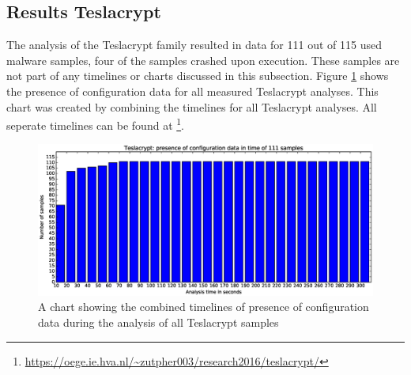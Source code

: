\documentclass[conference]{IEEEtran}
\begin{document}
\newpage
\subsection{Results Teslacrypt}
The analysis of the Teslacrypt family resulted in data for 111 out of 115 used malware samples, four of the samples crashed upon execution. These samples are not part of any timelines or charts discussed in this subsection. Figure \ref{fig:teslacrypt-bar} shows the presence of \Gls{configuration data} for all measured Teslacrypt analyses. This chart was created by combining the timelines for all Teslacrypt analyses. All seperate timelines can be found at \footnote{\url{https://oege.ie.hva.nl/~zutpher003/research2016/teslacrypt/}}.


\begin{figure}[h]
	\hspace{-3cm}
    \includegraphics[width=13cm,trim=-70mm 0mm 0mm 9mm, clip=true]{images/teslacrypt/teslacrypt-barchart.eps}
    \caption{A chart showing the combined timelines of presence of configuration data during the analysis of all Teslacrypt samples}
    \label{fig:teslacrypt-bar}
\end{figure}
\end{document}
